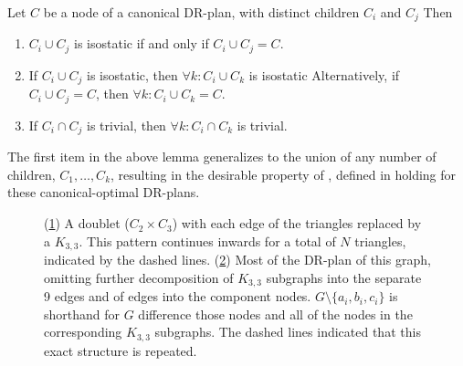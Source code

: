 \begin{lemma}\label{lemma:combined_lemma}
Let $C$ be a node of a canonical DR-plan, with distinct children $C_i$ and $C_j$
Then
\begin{enumerate}
    \item\label{lemma:wc_intersection_is_C}
    $C_i\cup C_j$ is isostatic if and only if $C_i\cup C_j = C$.

    \item\label{lemma:wc_intersection_makes_all_wc}
    If $C_i\cup C_j$ is isostatic, then $\forall k: C_i\cup C_k$ is isostatic Alternatively, if $C_i\cup C_j=C$, then $\forall k: C_i\cup C_k=C$.

    \item\label{lemma:uc_intersection_makes_all_uc}
    If $C_i\cap C_j$ is trivial, then $\forall k: C_i\cap C_k$ is trivial.
\end{enumerate}
\end{lemma}

\begin{remark}
The first item in the above lemma generalizes to the union of any number of
children, $C_1,\ldots,C_k$, resulting in the desirable property of ,
defined in \cite{hoffman2001decompositionI}
holding for these canonical-optimal DR-plans.
\end{remark}






\begin{figure*}\centering
\begin{subfigure}{.3\linewidth}\centering
    
    \caption{}\label{fig:c2c3ofk33s:a}
\end{subfigure}%
\begin{subfigure}{.7\linewidth}\centering
    
    \caption{}\label{fig:c2c3ofk33s:b}
\end{subfigure}

\caption{(\ref{fig:c2c3ofk33s:a}) A doublet ($C_2 \times C_3$) with each edge of the triangles replaced by a $K_{3,3}$. This pattern continues inwards for a total of $N$ triangles, indicated by the dashed lines. (\ref{fig:c2c3ofk33s:b}) Most of the DR-plan of this graph, omitting further decomposition of $K_{3,3}$ subgraphs into the separate 9 edges and of edges into the component nodes. $G\setminus\{a_i,b_i,c_i\}$ is shorthand for $G$ difference those nodes and all of the nodes in the corresponding $K_{3,3}$ subgraphs. The dashed lines indicated that this exact structure is repeated.}
\label{fig:c2c3ofk33s}
\end{figure*}

